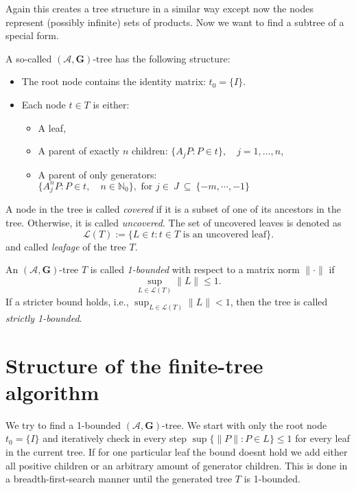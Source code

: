 Again this creates a tree structure in a similar way except now the nodes represent (possibly infinite) sets of products. 
Now we want to find a subtree of a special form. 

\begin{definition}
    A so-called $(\mathcal{A},\mathbf{G})\text{-tree}$ has the following structure: 
\begin{itemize}
    \item The root node contains the identity matrix: \( t_0 = \{I\} \).
    \item Each node \( t \in T \) is either:
    \begin{itemize}
        \item A leaf,
        \item A parent of exactly \( n \) children: \( \{A_j P : P \in t\},\quad j = 1, \dots, n \),
        \item A parent of only generators: \( \{A_j^n P : P \in t, \quad n \in \mathbb{N}_0\}, \text{ for } j\in~J~\subseteq ~\{ -m, \cdots, -1\}\)
    \end{itemize}
\end{itemize}
\end{definition}

\begin{definition}
    A node in the tree is called \emph{covered} if it is a subset of one of its ancestors in the tree. Otherwise, it is called \emph{uncovered}. 
    The set of uncovered leaves is denoted as
\[
    \mathcal{L}(T) := \{ L \in t : t \in T \text{ is an uncovered leaf} \}.
\]
and called \emph{leafage} of the tree $T$.
\end{definition}

\begin{definition}
An $(\mathcal{A},\mathbf{G})\text{-tree}$ $T$ is called \emph{1-bounded} with respect to a matrix norm \( \| \cdot \| \) if
\[
    \sup_{L \in \mathcal{L}(T)} \| L \| \leq 1.
\]
If a stricter bound holds, i.e., \( \sup_{L \in \mathcal{L}(T)} \| L \| < 1 \), then the tree is called \emph{strictly 1-bounded}.
\end{definition}

\section{Structure of the finite-tree algorithm}
We try to find a 1-bounded $(\mathcal{A},\mathbf{G})\text{-tree}$. We start with only the root node $t_0 = \{I\}$ and iteratively check in every step $ \sup \{\lVert P \rVert: P \in L\} \le 1$ for every leaf in the current tree. If for one particular leaf the bound doesnt hold we add either all positive children or an arbitrary amount of generator children. This is done in a breadth-first-search manner until the generated tree $T$ is 1-bounded. 

